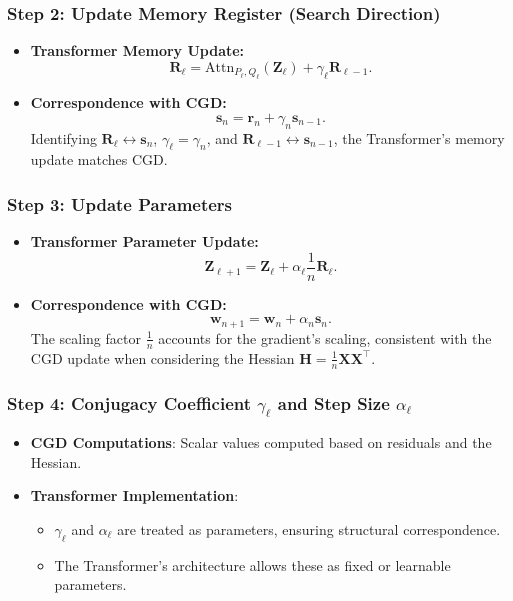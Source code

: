 \documentclass[11pt]{article}
\theoremstyle{plain}
\theoremstyle{definition}
\theoremstyle{remark}
\numberwithin{equation}{section}
\begin{document}
\subsubsection*{Step 2: Update Memory Register (Search Direction)}
\begin{itemize}
    \item \textbf{Transformer Memory Update:}
    \[
    \mathbf{R}_\ell = \mathrm{Attn}_{P_\ell, Q_\ell}(\mathbf{Z}_\ell) + \gamma_\ell \mathbf{R}_{\ell-1}.
    \]
    \item \textbf{Correspondence with CGD:}
    \[
    \mathbf{s}_n = \mathbf{r}_n + \gamma_n \mathbf{s}_{n-1}.
    \]
    Identifying \( \mathbf{R}_\ell \leftrightarrow \mathbf{s}_n \), \( \gamma_\ell = \gamma_n \), and \( \mathbf{R}_{\ell-1} \leftrightarrow \mathbf{s}_{n-1} \), the Transformer's memory update matches CGD.
\end{itemize}

\subsubsection*{Step 3: Update Parameters}
\begin{itemize}
    \item \textbf{Transformer Parameter Update:}
    \[
    \mathbf{Z}_{\ell+1} = \mathbf{Z}_\ell + \alpha_\ell \frac{1}{n} \mathbf{R}_\ell.
    \]
    \item \textbf{Correspondence with CGD:}
    \[
    \mathbf{w}_{n+1} = \mathbf{w}_n + \alpha_n \mathbf{s}_n.
    \]
    The scaling factor \( \frac{1}{n} \) accounts for the gradient's scaling, consistent with the CGD update when considering the Hessian \( \mathbf{H} = \frac{1}{n} \mathbf{X} \mathbf{X}^\top \).
\end{itemize}

\subsubsection*{Step 4: Conjugacy Coefficient \(\gamma_\ell\) and Step Size \(\alpha_\ell\)}
\begin{itemize}
    \item \textbf{CGD Computations}: Scalar values computed based on residuals and the Hessian.
    \item \textbf{Transformer Implementation}: 
    \begin{itemize}
        \item \( \gamma_\ell \) and \( \alpha_\ell \) are treated as parameters, ensuring structural correspondence.
        \item The Transformer's architecture allows these as fixed or learnable parameters.
    \end{itemize}
\end{itemize}
\end{document}
